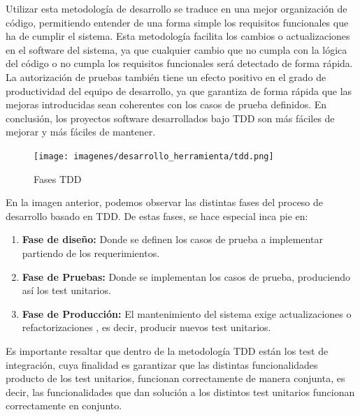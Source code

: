 \documentclass[a4paper,11pt]{book}
\begin{document}
Utilizar esta metodología de desarrollo se traduce en una mejor organización de código, permitiendo entender de una forma simple los requisitos funcionales que ha de cumplir el sistema. Esta metodología facilita los cambios o actualizaciones en el software del sistema, ya que cualquier cambio que no cumpla con la lógica del código o no cumpla los requisitos funcionales será detectado de forma rápida. La autorización de pruebas también tiene un efecto positivo en el grado de productividad del equipo de desarrollo, ya que garantiza de forma rápida que las mejoras introducidas sean coherentes con los casos de prueba definidos. En conclusión, los proyectos software desarrollados bajo TDD son más fáciles de mejorar y más fáciles de mantener. 

\begin{figure}[H] 
\centering 
\texttt{[image: imagenes/desarrollo\_herramienta/tdd.png]}
\caption{ Fases TDD\cite{tdd2}  }  
\end{figure} 
	


En la imagen anterior, podemos observar las distintas fases del proceso de desarrollo basado en TDD. De estas fases, se hace especial inca pie en:

\begin{enumerate}
\item \textbf{Fase de diseño:} Donde se definen los casos de prueba a implementar partiendo de los requerimientos.

\item \textbf{Fase de Pruebas:} Donde se implementan los casos de prueba, produciendo así los test unitarios.

\item \textbf{Fase de Producción:} El mantenimiento del sistema exige actualizaciones o refactorizaciones , es decir, producir nuevos test unitarios. 
\end{enumerate}

	 

Es importante resaltar que dentro de la metodología TDD están los test de integración, cuya finalidad es garantizar que las distintas funcionalidades producto de los test unitarios, funcionan correctamente de manera conjunta, es decir, las funcionalidades que dan solución a los  distintos test unitarios funcionan correctamente en conjunto. 
\end{document}
